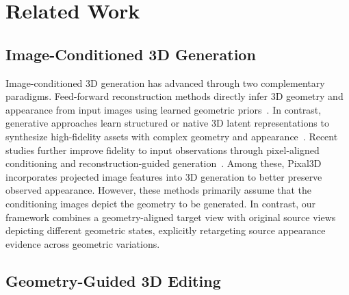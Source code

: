 \section{Related Work}
\label{sec:related_work}

\subsection{Image-Conditioned 3D Generation}

Image-conditioned 3D generation has advanced through two complementary paradigms.
%
Feed-forward reconstruction methods directly infer 3D geometry and appearance from input images using learned geometric priors~\cite{ICLR2024_dcad3425_lrm,xu2024instantmesh,wang2024crm,boss2025sf3d}.
%
In contrast, generative approaches learn structured or native 3D latent representations to synthesize high-fidelity assets with complex geometry and appearance~\cite{Xiang_2025_CVPR_Trellis,Xiang_2026_CVPR_Trellis2,zhao2025hunyuan3d,li2025triposg,li2025step1x3d}.
%
Recent studies further improve fidelity to input observations through pixel-aligned conditioning and reconstruction-guided generation~\cite{li2026pixal3d,chang2026reconviagen,huang2026unirecgen}.
%
Among these, Pixal3D~\cite{li2026pixal3d} incorporates projected image features into 3D generation to better preserve observed appearance.
%
However, these methods primarily assume that the conditioning images depict the geometry to be generated.
%
In contrast, our framework combines a geometry-aligned target view with original source views depicting different geometric states, explicitly retargeting source appearance evidence across geometric variations.

























\subsection{Geometry-Guided 3D Editing}

